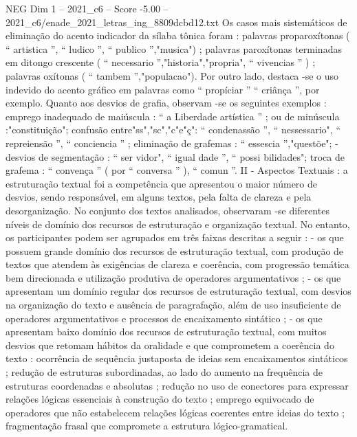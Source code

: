 \begin{textsample}{NEG Dim 1 – 2021\_c6 – Score -5.00 – 2021\_c6/enade\_2021\_letras\_ing\_8809dcbd12.txt}
Os casos mais sistemáticos de eliminação do acento indicador da sílaba tônica foram : palavras proparoxítonas ( “ artistica ”, “ ludico ”, “ publico ”,"musica") ; palavras paroxítonas terminadas em ditongo crescente ( “ necessario ”,"historia","propria", “ vivencias ” ) ; palavras oxítonas ( “ tambem ”,"populacao").
Por outro lado, destaca -se o uso indevido do acento gráfico em palavras como “ propíciar ” “ criânça ”, por exemplo.
Quanto aos desvios de grafia, observam -se os seguintes exemplos : emprego inadequado de maiúscula : “ a Liberdade artística ” ; ou de minúscula :"constituição"; confusão entre"ss","sc","c"e"ç": “ condenassão ”, “ nessessario", “ repreiensão ”, “ conciencia ” ; eliminação de grafemas : “ essescia ”,"questõe"; - desvios de segmentação : “ ser vidor", “ igual dade ”, “ possi bilidades"; troca de grafema : “ convença ” ( por “ conversa ” ), “ comun ”.
II - Aspectos Textuais : a estruturação textual foi a competência que apresentou o maior número de desvios, sendo responsável, em alguns textos, pela falta de clareza e pela desorganização.
No conjunto dos textos analisados, observaram -se diferentes níveis de domínio dos recursos de estruturação e organização textual.
No entanto, os participantes podem ser agrupados em três faixas descritas a seguir : - os que possuem grande domínio dos recursos de estruturação textual, com produção de textos que atendem às exigências de clareza e coerência, com progressão temática bem direcionada e utilização produtiva de operadores argumentativos ; - os que apresentam um domínio regular dos recursos de estruturação textual, com desvios na organização do texto e ausência de paragrafação, além de uso insuficiente de operadores argumentativos e processos de encaixamento sintático ; - os que apresentam baixo domínio dos recursos de estruturação textual, com muitos desvios que retomam hábitos da oralidade e que comprometem a coerência do texto : ocorrência de sequência justaposta de ideias sem encaixamentos sintáticos ; redução de estruturas subordinadas, ao lado do aumento na frequência de estruturas coordenadas e absolutas ; redução no uso de conectores para expressar relações lógicas essenciais à construção do texto ; emprego equivocado de operadores que não estabelecem relações lógicas coerentes entre ideias do texto ; fragmentação frasal que compromete a estrutura lógico-gramatical.

\end{textsample}
